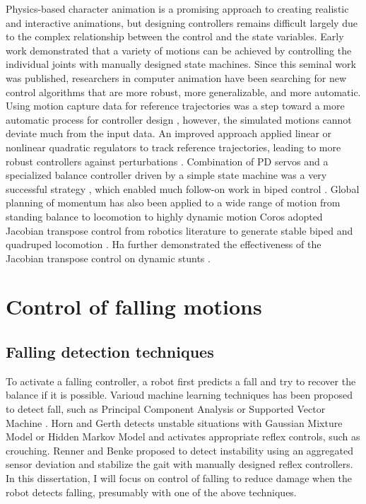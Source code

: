 Physics-based character animation is a promising approach to creating
realistic and interactive animations, but designing controllers
remains difficult largely due to the complex relationship between the
control and the state variables. Early work
\cite{Hodgins:1995:AHA,Wooten:1998:Phd} demonstrated that a variety of
motions can be achieved by controlling the individual joints with
manually designed state machines. Since this seminal work was
published, researchers in computer animation have been searching for
new control algorithms that are more robust, more generalizable, and
more automatic. Using motion capture data for reference
trajectories was a step toward a more automatic process for controller
design 
\cite{Zordan:2005:DRM,Sok:2007:SBB}, 
however, the simulated motions
cannot deviate much from the input data. An improved approach applied
linear or nonlinear quadratic regulators to track reference
trajectories, leading to more robust controllers against perturbations
\cite{daSilva:2008:ISS,Muico:2009:CNC}. Combination of PD servos and a
specialized balance controller driven by a simple state machine was a
very successful strategy \cite{Yin:2007:SIM}, which enabled much
follow-on work in biped control 
\cite{Wang:2009:OWC,Coros:2010:GBW,Lee:2010:DDB,Jain:2011:CPC}. 
Global planning of momentum
has also been applied to a wide range of motion from standing balance
\cite{Macchietto:2009:MCB} to locomotion 
\cite{Mordatch:2010:RPL,Ye:2010:OFC}
to highly dynamic motion 
\cite{Ha:2012:FAL,Liu:2012:TRC,AlBorno:2013:TOF,Zordan:2014:CRD}
Coros \etal adopted Jacobian transpose control from robotics literature
\cite{Sunada:1994:ACJ} to generate stable biped and quadruped
locomotion \cite{Coros:2010:GBW,Coros:2011:LSS}. Ha \etal further
demonstrated the effectiveness of the Jacobian transpose control on
dynamic stunts 
\cite{Liu:2010:SCM,Ha:2012:FAL,Ha:2014:ITD}.



\section{Control of falling motions}
\label{sec:related_falling}

\subsection{Falling detection techniques}
To activate a falling controller, a robot first predicts a fall and
try to recover the balance if it is possible.
Varioud machine learning techniques has been proposed to detect fall, such as
Principal Component Analysis \cite{Karssen:2008:FDW} or 
Supported Vector Machine \cite{Kim:2011:MLA}.
Horn and Gerth \cite{Hohn:2009:PBM} detects unstable situations with
Gaussian Mixture Model or Hidden Markov Model
and activates appropriate reflex controls, such as crouching. 
Renner and Benke \cite{Renner:2006:IDF} proposed to detect instability using
an aggregated sensor deviation and stabilize the gait with manually designed
reflex controllers. 
In this dissertation, 
I will focus on control of falling to reduce damage when the
robot detects falling, presumably with one of the above techniques. 

